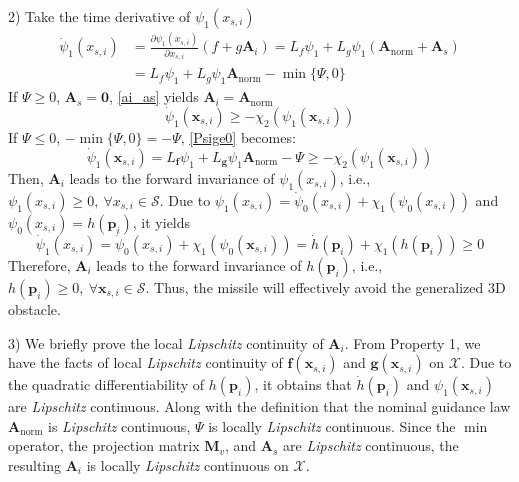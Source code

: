 \documentclass[lettersize,journal]{IEEEtran}
\begin{document}
2) Take the time derivative of $\psi_1({{x}}_{s,i})$
\begin{equation}
	\begin{split}
		\dot{\psi}_1({{x}}_{s,i}) & = \frac{\partial \psi_1({{x}}_{s,i})}{\partial {{x}}_{s,i}} ({f} +{g}{\boldsymbol{A}}_i) = L_{{f}}{\psi _1} + L_{{g}}{\psi _1}({\boldsymbol{A}}_{\mathrm{norm}} + {\boldsymbol{A}}_s) \\
		& = L_{{f}}{\psi _1} + L_{{g}}{\psi _1}{\boldsymbol{A}}_{\mathrm{norm}} - \min\{\Psi, 0\}
	\end{split}
\end{equation}
If $\Psi \ge 0$, ${\boldsymbol{A}}_s = \boldsymbol{0}$, \eqref{ai_as} yields ${\boldsymbol{A}}_i = {\boldsymbol{A}}_{\mathrm{norm}}$
\begin{equation}
	\label{Psige0}
	\dot{\psi}_1({\boldsymbol{x}}_{s,i}) \ge -{\chi _2}({\psi _1}({\boldsymbol{x}}_{s,i}))
\end{equation}
If $\Psi \le 0$, $-\min\{\Psi, 0\} = -\Psi$, \eqref{Psige0} becomes:
\begin{equation}
	\dot{\psi}_1({\boldsymbol{x}}_{s,i}) = L_{\boldsymbol{f}}{\psi _1} + L_{\boldsymbol{g}}{\psi _1}{\boldsymbol{A}}_{\mathrm{norm}} - \Psi  \ge -{\chi _2}({\psi _1}({\boldsymbol{x}}_{s,i}))
\end{equation}
Then, ${\boldsymbol{A}}_i$ leads to the forward invariance of $\psi_1({{x}}_{s,i})$, i.e., ${\psi _1}({{x}}_{s,i}) \ge 0, \ \forall {{x}}_{s,i} \in \mathcal{S}$. Due to ${\psi _1}({{x}}_{s,i}) = {\dot{\psi} _0}({{x}}_{s,i}) + {\chi _1}({\psi _0}({{x}}_{s,i}))$ and $\psi_0({{x}}_{s,i}) = h({\boldsymbol{p}}_i)$, it yields
\begin{equation}
	\dot{\psi}_1({{x}}_{s,i})=\dot{\psi}_0({{x}}_{s,i}) + {\chi _1}({\psi _0}({\boldsymbol{x}}_{s,i})) = \dot{h}({\boldsymbol{p}}_i) + {\chi _1}(h({\boldsymbol{p}}_i)) \ge 0
\end{equation}
Therefore, ${\boldsymbol{A}}_i$ leads to the forward invariance of $h({\boldsymbol{p}}_i)$, i.e., $h({\boldsymbol{p}}_i) \ge 0, \ \forall {\boldsymbol{x}}_{s,i} \in \mathcal{S}$. Thus, the missile will effectively avoid the generalized 3D obstacle.

3) We briefly prove the local \textit{Lipschitz} continuity of ${\boldsymbol{A}}_i$. From Property 1, we have the facts of local \textit{Lipschitz} continuity of ${\boldsymbol{f}}({\boldsymbol{x}}_{s,i})$ and ${\boldsymbol{g}}({\boldsymbol{x}}_{s,i})$ on $\mathcal{X}$. Due to the quadratic differentiability of $h({\boldsymbol{p}}_i)$, it obtains that $\dot{h}({\boldsymbol{p}}_i)$ and ${\psi _1}({\boldsymbol{x}}_{s,i})$ are \textit{Lipschitz} continuous. Along with the definition that the nominal guidance law ${\boldsymbol{A}}_{\mathrm{norm}}$ is \textit{Lipschitz} continuous, $\Psi$ is locally \textit{Lipschitz} continuous. Since the $\min$ operator, the projection matrix ${\boldsymbol{M}}_v$, and ${\boldsymbol{A}}_s$ are \textit{Lipschitz} continuous, the resulting ${\boldsymbol{A}}_i$ is locally \textit{Lipschitz} continuous on $\mathcal{X}$.
\end{document}
